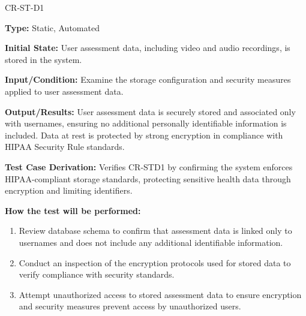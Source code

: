 \documentclass[12pt, titlepage]{article}
\begin{document}
\begin{itemize}
  \begin{item}
    CR-ST-D1
    \begin{mdframed}[linewidth=0.5mm]
      \textbf{Type:} Static, Automated \par
      \textbf{Initial State:} User assessment data, including video and audio recordings, is stored in the system. \par
      \textbf{Input/Condition:} Examine the storage configuration and security measures applied to user assessment data. \par
      \textbf{Output/Results:} User assessment data is securely stored and associated only with usernames, 
      ensuring no additional personally identifiable information is \\ included. Data at rest is protected by strong encryption 
      in compliance with HIPAA Security Rule standards. \par
      \textbf{Test Case Derivation:} Verifies CR-STD1 by confirming the system enforces HIPAA-compliant storage standards, protecting sensitive health data through encryption and limiting identifiers. \par
      \textbf{How the test will be performed:}
      \begin{enumerate}[noitemsep]
        \item Review database schema to confirm that assessment data is linked only to usernames and does not
         include any additional identifiable information.
        \item Conduct an inspection of the encryption protocols used for stored data to verify compliance with
         security standards.
        \item Attempt unauthorized access to stored assessment data to ensure encryption and security measures
         prevent access by unauthorized users.
      \end{enumerate}
    \end{mdframed}
  \end{item}
\end{itemize}
\end{document}
